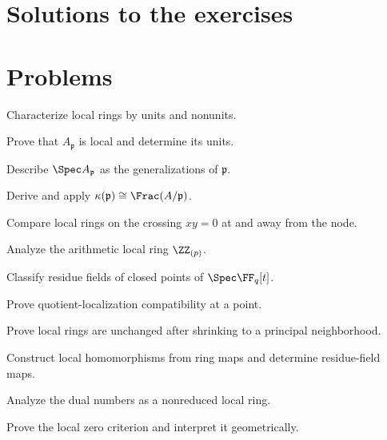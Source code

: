 \ifdefined\IncludeExerciseSolutions
\section*{Solutions to the exercises}

\fi

\section{Problems}
\ifdefined\FullProblemDossiers

\else
\begin{problem}Characterize local rings by units and nonunits.\end{problem}
\begin{problem}Prove that $A_{\mathfrak p}$ is local and determine its units.\end{problem}
\begin{problem}Describe $\Spec A_{\mathfrak p}$ as the generalizations of $\mathfrak p$.\end{problem}
\begin{problem}Derive and apply $\kappa(\mathfrak p)\cong\Frac(A/\mathfrak p)$.\end{problem}
\begin{problem}Compare local rings on the crossing $xy=0$ at and away from the node.\end{problem}
\begin{problem}Analyze the arithmetic local ring $\ZZ_{(p)}$.\end{problem}
\begin{problem}Classify residue fields of closed points of $\Spec\FF_q[t]$.\end{problem}
\begin{problem}Prove quotient-localization compatibility at a point.\end{problem}
\begin{problem}Prove local rings are unchanged after shrinking to a principal neighborhood.\end{problem}
\begin{problem}Construct local homomorphisms from ring maps and determine residue-field maps.\end{problem}
\begin{problem}Analyze the dual numbers as a nonreduced local ring.\end{problem}
\begin{problem}Prove the local zero criterion and interpret it geometrically.\end{problem}
